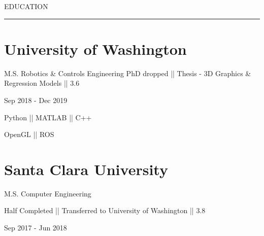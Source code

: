 \documentclass[letterpaper,10pt,oneside]{article}
\begin{document}
\begin{body}


{
\hspace{-1.72in}\noindent\color{cblue}
{EDUCATION} %
}

\vspace{-1.6ex}
{\hspace{-1.73in}\noindent\color{dblue}\rule{6.935in}{0.4pt}} %
\vspace{-5ex}


\section
{\textbf{University of Washington}}{}

{\small M.S. Robotics \& Controls Engineering}
\BulletItem
{\small PhD dropped || Thesis - 3D Graphics \& Regression Models || 3.6}

\begin{subtitle}
\vspace{-8ex}
{{Sep 2018 - Dec 2019}}
\end{subtitle}

\vspace{-1ex}

{
\vspace{1.4ex}
\color{cyan}\small
{Python || MATLAB || C++} %
}

{
\vspace{-2.5ex}\hspace{3.17in}
\color{cyan}\small
{OpenGL || ROS} %
}
\vspace{-2.5ex}


\section
{\textbf{Santa Clara University}}{}{}

{{\small M.S. Computer Engineering }}
\begin{detail}
\BulletItem
Half Completed || Transferred to University of Washington || 3.8
\end{detail}

\begin{subtitle}
\vspace{-8ex}
{{Sep 2017 - Jun 2018}}
\end{subtitle}

\vspace{1ex}


\end{body}
\end{document}
